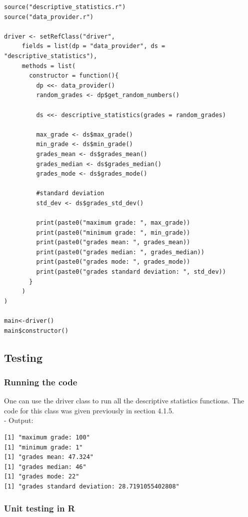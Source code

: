 \documentclass[11pt]{article}
\begin{document}
\begin{lstlisting}
source("descriptive_statistics.r")
source("data_provider.r")

driver <- setRefClass("driver",
     fields = list(dp = "data_provider", ds = "descriptive_statistics"),
     methods = list(
       constructor = function(){
         dp <<- data_provider()
         random_grades <- dp$get_random_numbers()
         
         ds <<- descriptive_statistics(grades = random_grades)
         
         max_grade <- ds$max_grade()
         min_grade <- ds$min_grade()
         grades_mean <- ds$grades_mean()
         grades_median <- ds$grades_median()
         grades_mode <- ds$grades_mode()
         
         #standard deviation
         std_dev <- ds$grades_std_dev()
         
         print(paste0("maximum grade: ", max_grade))
         print(paste0("minimum grade: ", min_grade))
         print(paste0("grades mean: ", grades_mean))
         print(paste0("grades median: ", grades_median))
         print(paste0("grades mode: ", grades_mode))
         print(paste0("grades standard deviation: ", std_dev))
       }
     )
)

main<-driver()
main$constructor()
\end{lstlisting}

\subsection{Testing}

\subsubsection{Running the code}

One can use the driver class to run all the descriptive statistics functions. The code for this class was given previously in section 4.1.5.\\

- Output:

\begin{lstlisting}
[1] "maximum grade: 100"
[1] "minimum grade: 1"
[1] "grades mean: 47.324"
[1] "grades median: 46"
[1] "grades mode: 22"
[1] "grades standard deviation: 28.7191055402808"
\end{lstlisting}

\subsubsection{Unit testing in R}
\end{document}
